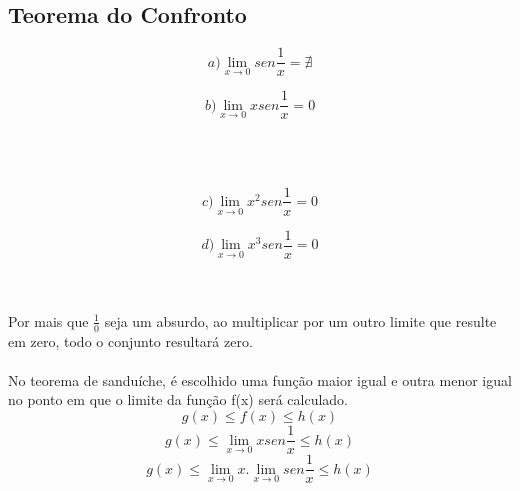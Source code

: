\documentclass{article}
\begin{document}
		\subsection{Teorema do Confronto}
			\begin{minipage}{5 cm}
				 \[ a) \lim_{x\to 0} sen \frac{1}{x} = \nexists \]
			\end{minipage}
			\begin{minipage}{5 cm}
				\[ b) \lim_{x\to 0} xsen \frac{1}{x} = 0\]
			\end{minipage}
			\\ \\
			\begin{minipage}{5 cm}
				\[ c) \lim_{x\to 0} x^2sen \frac{1}{x} = 0\]
			\end{minipage}
			\begin{minipage}{5 cm}
				\[ d) \lim_{x\to 0} x^3sen \frac{1}{x} = 0 \]
			\end{minipage}
			\\ \\
			Por mais que $\frac{1}{0}$ seja um absurdo, ao multiplicar por um outro limite que resulte em zero, todo o conjunto resultará zero.
			\\ \\
			No teorema de sanduíche, é escolhido uma função maior igual e outra menor igual no ponto em que o limite da função f(x) será calculado.
			\[ g(x) \leq f(x) \leq h(x)\]
			\[ g(x) \leq \lim_{x\to 0}xsen \frac{1}{x} \leq h(x)\]
			\[ g(x) \leq \lim_{x\to 0}x . \lim_{x\to 0}sen \frac{1}{x} \leq h(x)\]
			
\end{document}
